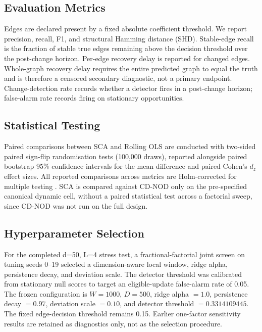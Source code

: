 \documentclass{ieeeaccess}
\begin{document}
\subsection{Evaluation Metrics}
\label{sec:metrics}
Edges are declared present by a fixed absolute coefficient threshold. We report precision, recall, F1, and structural Hamming distance (SHD). Stable-edge recall is the fraction of stable true edges remaining above the decision threshold over the post-change horizon. Per-edge recovery delay is reported for changed edges. Whole-graph recovery delay requires the entire predicted graph to equal the truth and is therefore a censored secondary diagnostic, not a primary endpoint. Change-detection rate records whether a detector fires in a post-change horizon; false-alarm rate records firing on stationary opportunities.

\subsection{Statistical Testing}
\label{sec:stats}
Paired comparisons between SCA and Rolling OLS are conducted with two-sided paired sign-flip randomisation tests (100,000 draws), reported alongside paired bootstrap 95\% confidence intervals for the mean difference and paired Cohen's $d_z$ effect sizes. All reported comparisons across metrics are Holm-corrected for multiple testing \cite{r15}. SCA is compared against CD-NOD only on the pre-specified canonical dynamic cell, without a paired statistical test across a factorial sweep, since CD-NOD was not run on the full design.

\subsection{Hyperparameter Selection}
\label{sec:hyper}
For the completed d=50, L=4 stress test, a fractional-factorial joint screen on tuning seeds 0--19 selected a dimension-aware local window, ridge alpha, persistence decay, and deviation scale. The detector threshold was calibrated from stationary null scores to target an eligible-update false-alarm rate of 0.05. The frozen configuration is $W=1000$, $D=500$, ridge alpha $=1.0$, persistence decay $=0.97$, deviation scale $=0.10$, and detector threshold $=0.3314109445$. The fixed edge-decision threshold remains 0.15. Earlier one-factor sensitivity results are retained as diagnostics only, not as the selection procedure.
\end{document}
